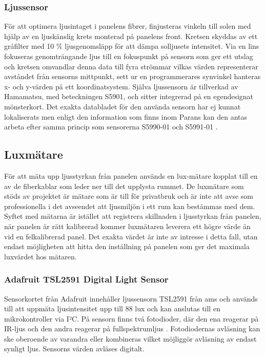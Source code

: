         \subsubsection{Ljussensor} %
        \label{ssub:ljussensor}
            För att optimera ljusintaget i panelens fibrer, finjusteras vinkeln till solen med hjälp av en ljuskänslig krets monterad på panelens front. Kretsen skyddas av ett gråfilter med 10 \% ljusgenomsläpp för att dämpa solljusets intensitet. Via en lins fokuseras genomträngande ljus till en fokuspunkt på sensorn som ger ett utslag och kretsen omvandlar denna data till fyra strömmar vilkas värden representerar avståndet från sensorns mittpunkt, sett ur en programmerares synvinkel hanteras x- och y-värden på ett koordinatsystem. Själva ljussensorn är tillverkad av Hamamatsu, med beteckningen S5901, och sitter integrerad på en egendesignat mönsterkort. Det exakta databladet för den använda sensorn har ej kunnat lokaliserats men enligt den information som finns inom Parans kan den antas arbeta efter samma princip som sensorerna S5990-01 och S5991-01 \cite{hama}.

    \subsection{Luxmätare} %
    \label{sub:luxm_tare}
    För att mäta upp ljusstyrkan från panelen används en lux-mätare kopplat till en av de fiberkablar som leder ner till det upplysta rummet. De luxmätare som stöds av projektet är mätare  som är till för privatbruk och är inte att avse som professionella i det avseendet att ljusmiljön i ett rum kan bestämmas med dem. Syftet med mätarna är istället att registrera skillnaden i ljusstyrkan från panelen, när panelen är rätt kalibrerad kommer luxmätaren leverera ett högre värde än vid en felkalibrerad panel. Det exakta värdet är inte av intresse i detta fall, utan endast möjligheten att hitta den inställning på panelen som ger det maximala luxvärdet hos mätaren.

    \subsubsection{Adafruit TSL2591 Digital Light Sensor}
        \label{ssub:ada_tsl2591}
        Sensorkortet från Adafruit innehåller ljussensorn TSL2591 från ams och används till att uppmäta ljusintensitet upp till 88 lux och kan anslutas till en mikrokontroller via I²C. På sensorn finns två fotodioder, där den ena reagerar på IR-ljus och den andra reagerar på fullspektrumljus \cite{TSL2591}. Fotodiodernas avläsning kan ske oberoende av varandra eller kombineras vilket möjliggör avläsning av endast synligt ljus. Sensorns värden avläses digitalt.


